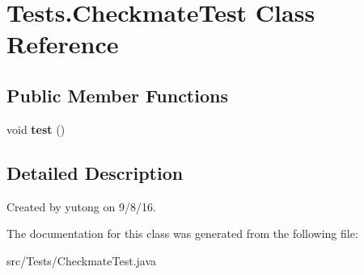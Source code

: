 \hypertarget{classTests_1_1CheckmateTest}{\section{Tests.\-Checkmate\-Test Class Reference}
\label{classTests_1_1CheckmateTest}
}
\subsection*{Public Member Functions}
\begin{DoxyCompactItemize}
\item 
\hypertarget{classTests_1_1CheckmateTest_ae95e3b938a1a132d72c5f542bbe52912}{void {\bfseries test} ()}\label{classTests_1_1CheckmateTest_ae95e3b938a1a132d72c5f542bbe52912}

\end{DoxyCompactItemize}


\subsection{Detailed Description}
Created by yutong on 9/8/16. 

The documentation for this class was generated from the following file\-:\begin{DoxyCompactItemize}
\item 
src/\-Tests/Checkmate\-Test.\-java\end{DoxyCompactItemize}
